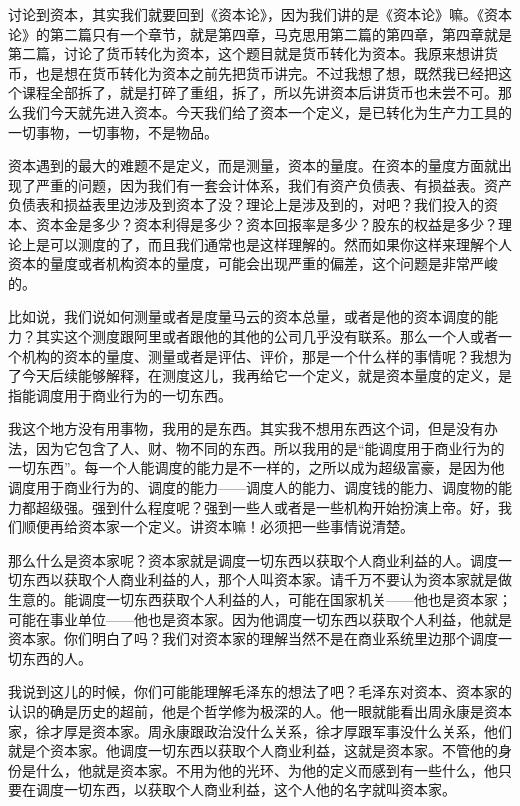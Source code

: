 \documentclass[UTF8, 12pt, a4paper]{ctexrep}
\begin{document}
讨论到资本，其实我们就要回到《资本论》，因为我们讲的是《资本论》嘛。《资本论》的第二篇只有一个章节，就是第四章，马克思用第二篇的第四章，第四章就是第二篇，讨论了货币转化为资本，这个题目就是货币转化为资本。我原来想讲货币，也是想在货币转化为资本之前先把货币讲完。不过我想了想，既然我已经把这个课程全部拆了，就是打碎了重组，拆了，所以先讲资本后讲货币也未尝不可。那么我们今天就先进入资本。今天我们给了资本一个定义，是已转化为生产力工具的一切事物，一切事物，不是物品。

资本遇到的最大的难题不是定义，而是测量，资本的量度。在资本的量度方面就出现了严重的问题，因为我们有一套会计体系，我们有资产负债表、有损益表。资产负债表和损益表里边涉及到资本了没？理论上是涉及到的，对吧？我们投入的资本、资本金是多少？资本利得是多少？资本回报率是多少？股东的权益是多少？理论上是可以测度的了，而且我们通常也是这样理解的。然而如果你这样来理解个人资本的量度或者机构资本的量度，可能会出现严重的偏差，这个问题是非常严峻的。

比如说，我们说如何测量或者是度量马云的资本总量，或者是他的资本调度的能力？其实这个测度跟阿里或者跟他的其他的公司几乎没有联系。那么一个人或者一个机构的资本的量度、测量或者是评估、评价，那是一个什么样的事情呢？我想为了今天后续能够解释，在测度这儿，我再给它一个定义，就是资本量度的定义，是指能调度用于商业行为的一切东西。

我这个地方没有用事物，我用的是东西。其实我不想用东西这个词，但是没有办法，因为它包含了人、财、物不同的东西。所以我用的是“能调度用于商业行为的一切东西”。每一个人能调度的能力是不一样的，之所以成为超级富豪，是因为他调度用于商业行为的、调度的能力——调度人的能力、调度钱的能力、调度物的能力都超级强。强到什么程度呢？强到一些人或者是一些机构开始扮演上帝。好，我们顺便再给资本家一个定义。讲资本嘛！必须把一些事情说清楚。

那么什么是资本家呢？资本家就是调度一切东西以获取个人商业利益的人。调度一切东西以获取个人商业利益的人，那个人叫资本家。请千万不要认为资本家就是做生意的。能调度一切东西获取个人利益的人，可能在国家机关——他也是资本家；可能在事业单位——他也是资本家。因为他调度一切东西以获取个人利益，他就是资本家。你们明白了吗？我们对资本家的理解当然不是在商业系统里边那个调度一切东西的人。

我说到这儿的时候，你们可能能理解毛泽东的想法了吧？毛泽东对资本、资本家的认识的确是历史的超前，他是个哲学修为极深的人。他一眼就能看出周永康是资本家，徐才厚是资本家。周永康跟政治没什么关系，徐才厚跟军事没什么关系，他们就是个资本家。他调度一切东西以获取个人商业利益，这就是资本家。不管他的身份是什么，他就是资本家。不用为他的光环、为他的定义而感到有一些什么，他只要在调度一切东西，以获取个人商业利益，这个人他的名字就叫资本家。
\end{document}
